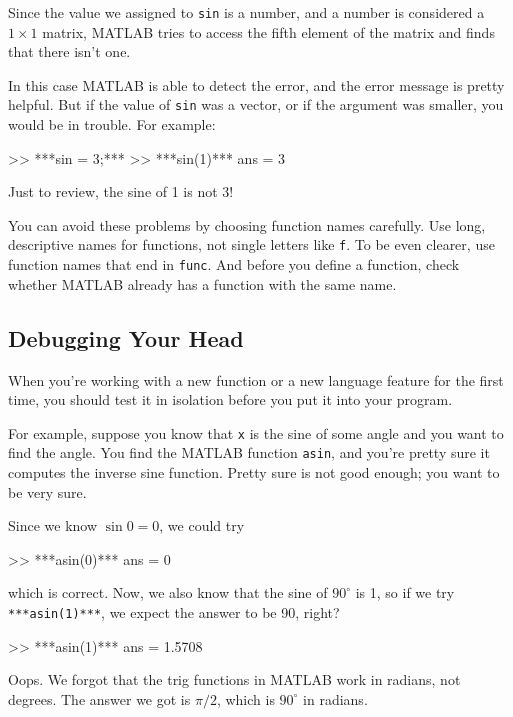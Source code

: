 Since the value we assigned to \lstinline{sin} is a number, and a number is considered a $1 \times 1$ matrix, MATLAB tries to access the fifth element of the matrix and finds that there isn't one.

In this case MATLAB is able to detect the error, and the error message is pretty helpful.
But if the value of \lstinline{sin} was a vector, or if the argument was smaller, you would be in trouble.  For example:

\begin{code}
>> ***sin = 3;***
>> ***sin(1)***
ans = 3
\end{code}

Just to review, the sine of 1 is not 3!

You can avoid these problems by choosing function names carefully. Use long, descriptive names for functions, not single letters like \lstinline{f}. To be even clearer, use function names that end in \lstinline{func}. And before you define a function, check whether MATLAB already has a function with the same name.

\subsection{Debugging Your Head}

When you're working with a new function or a new language feature
for the first time, you should test it in isolation before you
put it into your program.


For example, suppose you know that \lstinline{x} is the sine of some
angle and you want to find the angle.  You find the MATLAB function
\lstinline{asin}, and you're pretty sure it computes the inverse sine
function.  Pretty sure is not good enough; you want to be very sure.

Since we know $\sin 0 = 0$, we could try

\begin{code}
>> ***asin(0)***
ans = 0
\end{code}
which is correct.  Now, we also know that the sine of $90^\circ$ is
1, so if we try \lstinline{***asin(1)***}, we expect the answer to be 90, right?

\begin{code}
>> ***asin(1)***
ans = 1.5708
\end{code}

Oops.  We forgot that the trig functions in MATLAB work in radians,
not degrees.  The answer we got is $\pi/2$, which is $90^\circ$ in radians.

